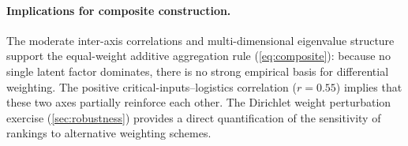 \paragraph{Implications for composite construction.}
The moderate inter-axis correlations and multi-dimensional eigenvalue
structure support the equal-weight additive aggregation rule
(\cref{eq:composite}): because no single latent factor dominates,
there is no strong empirical basis for differential weighting.
The positive critical-inputs--logistics correlation ($r =
0.55$) implies that these two axes partially reinforce each other.
The Dirichlet weight perturbation exercise (\cref{sec:robustness})
provides a direct quantification of the sensitivity of rankings to
alternative weighting schemes.
